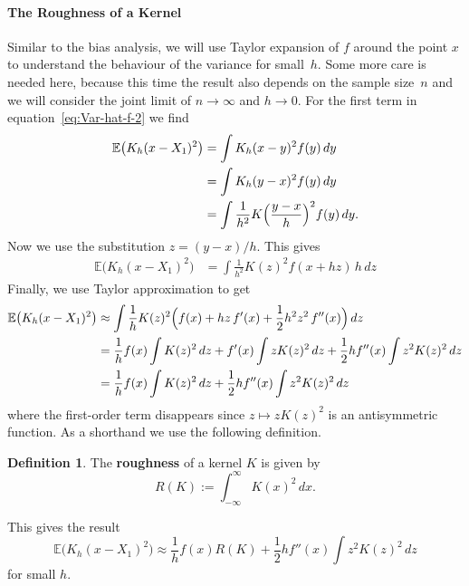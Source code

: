 \documentclass[
  a4paper,
]{article}
\theoremstyle{definition}
\newtheorem{definition}{Definition}[section]
\theoremstyle{definition}
\theoremstyle{definition}
\theoremstyle{definition}
\theoremstyle{remark}
\begin{document}
\paragraph{The Roughness of a Kernel}\label{the-roughness-of-a-kernel}

Similar to the bias analysis, we will use Taylor expansion of \(f\) around
the point \(x\) to understand the behaviour of the variance for small~\(h\). Some more care is needed here, because this time the
result also depends on the sample size~\(n\) and we will consider the joint
limit of \(n \to \infty\) and \(h\to 0\). For the first term in
equation~\eqref{eq:Var-hat-f-2} we find
\begin{align*}
  \mathbb{E}\bigl( K_h(x - X_1)^2 \bigr)
  &= \int K_h(x - y)^2 f(y) \,dy \\
  &= \int K_h(y - x)^2 f(y) \,dy \\
  &= \int \frac{1}{h^2} K\Bigl( \frac{y - x}{h} \Bigr)^2 f(y) \,dy.
\end{align*}
Now we use the substitution \(z = (y - x) / h\). This gives
\begin{align*}
  \mathbb{E}\bigl( K_h(x - X_1)^2 \bigr)
  &= \int \frac{1}{h^2} K(z)^2 f(x + hz) \,h \,dz
\end{align*}
Finally, we use Taylor approximation to get
\begin{align*}
  \mathbb{E}\bigl( K_h(x - X_1)^2 \bigr)
  &\approx \int \frac{1}{h} K(z)^2 \Bigl( f(x) + hz\,f'(x) + \frac12 h^2 z^2 \,f''(x) \Bigr) \,dz \\
  &= \frac{1}{h} f(x) \int K(z)^2 \,dz
      + f'(x) \int z K(z)^2 \,dz
      + \frac12 h f''(x) \int z^2 K(z)^2 \,dz \\
  &= \frac{1}{h} f(x) \int K(z)^2 \,dz
      + \frac12 h f''(x) \int z^2 K(z)^2 \,dz
\end{align*}
where the first-order term disappears since \(z \mapsto z K(z)^2\) is an
antisymmetric function. As a shorthand we use the following definition.

\begin{definition}
The \textbf{roughness} of a kernel \(K\) is given by
\begin{equation*}
  R(K)
  := \int_{-\infty}^\infty K(x)^2 \,dx.
\end{equation*}
\end{definition}

This gives the result
\begin{equation}
  \mathbb{E}\bigl( K_h(x - X_1)^2 \bigr)
  \approx \frac{1}{h} f(x) R(K) + \frac12 h f''(x) \int z^2 K(z)^2 \,dz
                             \label{eq:Var-frag1}
\end{equation}
for small \(h\).
\end{document}
